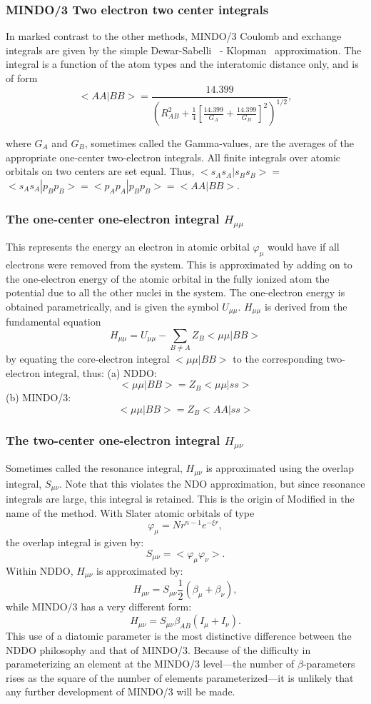 \documentclass[a4paper]{book}
\begin{document}
\subsubsection{MINDO/3 Two electron two center integrals}
 In marked contrast to the other methods, MINDO/3 Coulomb
and exchange integrals are given by the simple Dewar-Sabelli~\cite{rab,rab2} -
Klopman~\cite{rab3} approximation. The integral is a
function of the atom types and the interatomic distance
only, and is of form
$$
<AA|BB>=\frac{14.399}{(R_{AB}^2+\frac{1}{4}[\frac{14.399}{G_A}+
\frac{14.399}{G_B}]^2)^{1/2}},
$$

where $G_A$ and $G_B$, sometimes called the Gamma-values,
are the averages of the appropriate
one-center two-electron integrals. All finite integrals
over atomic orbitals on two centers are set equal. Thus,
$<s_As_A|s_Bs_B> =$  $<s_As_A|p_Bp_B> =<p_Ap_A|p_Bp_B> =<AA|BB> $.
\subsubsection{The one-center one-electron integral $H_{\mu\mu}$}\label{1e1c}
 This represents the energy an electron in atomic orbital
$\varphi_{\mu}$ would have if all electrons were removed from the system.
This is approximated by adding on to the one-electron energy
of the atomic orbital in the fully ionized atom the
potential due to all the other nuclei in the system. The
one-electron energy is obtained parametrically, and is given
the symbol $U_{\mu\mu}$. $H_{\mu\mu}$ is derived from the fundamental
equation
$$
H_{\mu\mu}=U_{\mu\mu}-\sum_{B\neq A}Z_B<\mu\mu|BB>
$$
by equating the core-electron integral $<\mu\mu|BB>$ to the
corresponding two-electron integral, thus:
(a) NDDO:
$$
<\mu\mu|BB>= Z_B<\mu\mu|ss>
$$
(b) MINDO/3:
$$
<\mu\mu|BB>= Z_B<AA|ss>
$$
\subsubsection{The two-center one-electron integral $H_{\mu\nu}$ }

 Sometimes called the resonance integral, $H_{\mu\nu}$ is
approximated using the overlap integral, $S_{\mu\nu}$. Note that
this violates the NDO approximation, but since resonance
integrals are large, this integral is retained. This is the
origin of Modified in the name of the method.
With Slater atomic orbitals of type
$$
\varphi_\mu = Nr^{n-1}e^{-\xi r},
$$
the overlap integral is given by:
$$
S_{\mu\nu} = <\varphi_{\mu}\varphi_{\nu}>.
$$
Within NDDO, $H_{\mu\nu}$ is approximated by:
$$
H_{\mu\nu} = S_{\mu\nu}\frac{1}{2}(\beta_{\mu}+\beta_{\nu}),
$$
while MINDO/3 has a very different form:
$$
H_{\mu\nu} = S_{\mu\nu}\beta_{AB}(I_{\mu}+I_{\nu}).
$$
 This use of a diatomic parameter is the most distinctive
difference between the NDDO philosophy and that of
MINDO/3. Because of the difficulty in parameterizing an
element at the MINDO/3 level---the number of $\beta$-parameters
rises as the square of the number of elements
parameterized---it is unlikely that any further development
of MINDO/3 will be made.
\end{document}
